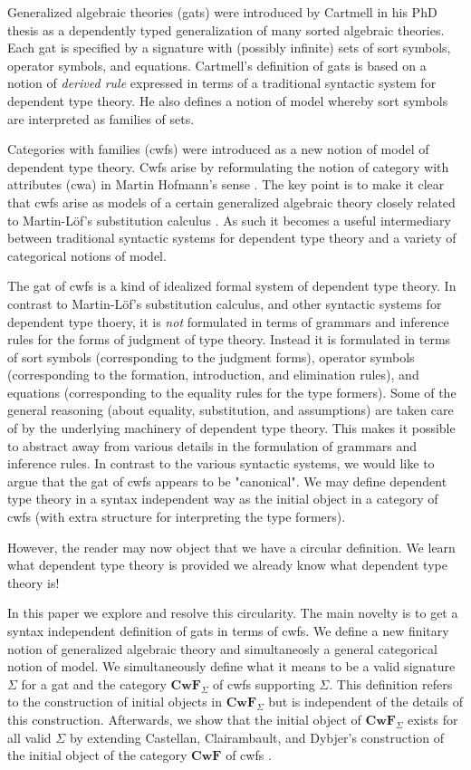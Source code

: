 \documentclass{lmcs}
\def\Cwf{\mathbf{CwF}}
\begin{document}
Generalized algebraic theories (gats) were introduced by Cartmell in his PhD thesis \cite{cartmell:phd} as a dependently typed generalization of many sorted algebraic theories. Each gat is specified by a signature with (possibly infinite) sets of sort symbols, operator symbols, and equations. Cartmell's definition of gats \cite{cartmell:phd,cartmell:apal} is based on a notion of {\em derived rule} expressed in terms of a traditional syntactic system for dependent type theory. He also defines a notion of model whereby sort symbols are interpreted as families of sets.

Categories with families (cwfs) \cite{dybjer:torino} were introduced as a new notion of model of dependent type theory. Cwfs arise by reformulating the notion of category with attributes (cwa) in Martin Hofmann's sense \cite{hofmann:csl}. The key point is to make it clear that cwfs arise as models of a certain generalized algebraic theory closely related to Martin-Löf's substitution calculus \cite{martinlof:gbg92}. As such it becomes a useful intermediary between traditional syntactic systems for dependent type theory and a variety of categorical notions of model.

The gat of cwfs is a kind of idealized formal system of dependent type theory. In contrast to Martin-Löf's substitution calculus, and other syntactic systems for dependent type thoery, it is {\em not} formulated in terms of grammars and inference rules for the forms of judgment of type theory. Instead it is formulated in terms of sort symbols (corresponding to the judgment forms), operator symbols (corresponding to the formation, introduction, and elimination rules), and equations (corresponding to the equality rules for the type formers). Some of the general reasoning (about equality, substitution, and assumptions) are taken care of by the underlying machinery of dependent type theory. This makes it possible to abstract away from various details in the formulation of grammars and inference rules. In contrast to the various syntactic systems, we would like to argue that the gat of cwfs appears to be "canonical". We may define dependent type theory in a syntax independent way as the initial object in a category of cwfs (with extra structure for interpreting the type formers). 

However, the reader may now object that we have a circular definition. We learn what dependent type theory is provided we already know what dependent type theory is!

In this paper we explore and resolve this circularity. The main novelty is to get a syntax independent definition of gats in terms of cwfs. We define a new finitary notion of generalized algebraic theory and simultaneosly a general categorical notion of model. We simultaneously define what it means to be a valid signature $\Sigma$ for a gat and the category $\Cwf_\Sigma$ of cwfs supporting $\Sigma$. This definition refers to the construction of initial objects in $\Cwf_\Sigma$ but is independent of the details of this construction. Afterwards, we show that the initial object of $\Cwf_\Sigma$ exists for all valid $\Sigma$ by extending Castellan, Clairambault, and Dybjer's  construction of the initial object of the category $\Cwf$ of cwfs \cite{castellan:tlca2015,castellan:lmcs}.
\end{document}
